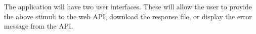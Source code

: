 The application will have two user interfaces.
These will allow the user to provide the above stimuli to the web API, download the response file, or display the error message from the API.






